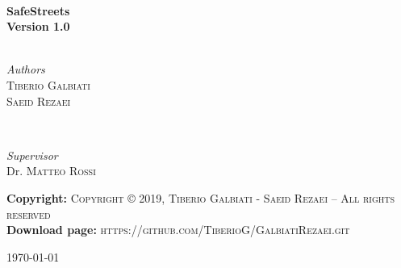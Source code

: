 \begin{titlepage}
	\HRule\\[0.4cm]
	
	{\huge\bfseries SafeStreets}\\[0.4cm] 
	\textbf{Version 1.0}\\
	
	\HRule\\[1.5cm]
	
	
	\begin{minipage}{0.4\textwidth}
		\begin{flushleft}
			\large
			\textit{Authors}\\
			 \textsc{Tiberio Galbiati} \\
			 \textsc{Saeid Rezaei} 
		\end{flushleft}
	\end{minipage}
	~
	\begin{minipage}{0.4\textwidth}
		\begin{flushright}
			\large
			\textit{Supervisor}\\
			Dr. \textsc {Matteo Rossi} 
		\end{flushright}
	\end{minipage}
	

\vfill\vfil
	\textbf{Copyright:} \textsc{ Copyright © 2019,  Tiberio Galbiati - Saeid Rezaei  – All rights reserved }\\[0.5cm] 
	\textbf{Download page:} \textsc{ https://github.com/TiberioG/GalbiatiRezaei.git }\\[0.5cm] 
	
	
	
	\vfill\vfill\vfill %
	
	{\large\today} %
	

	
	 
	
	\vfill 
	
\end{titlepage}






